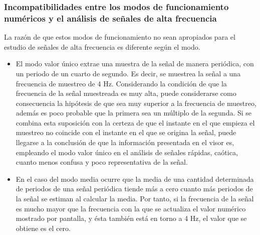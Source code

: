 \subsubsection[Modos numéricos y señales de alta frecuencia]{Incompatibilidades entre los modos de funcionamiento numéricos y el análisis de señales de alta frecuencia}

La razón de que estos modos de funcionamiento no sean apropiados para el estudio de señales de alta frecuencia es diferente según el modo.

\begin{itemize}
	\item El modo valor único extrae una muestra de la señal de manera periódica, con un periodo de un cuarto de segundo. Es decir, se muestrea la señal a una frecuencia de muestreo de 4 Hz. Considerando la condición de que la frecuencia de la señal muestreada es muy alta, puede considerarse como consecuencia la hipótesis de que sea muy superior a la frecuencia de muestreo, además es poco probable que la primera sea un múltiplo de la segunda. Si se combina esta suposición con la certeza de que el instante en el que empieza el muestreo no coincide con el instante en el que se origina la señal, puede llegarse a la conclusión de que la información presentada en el visor es, empleando el modo valor único en el análisis de señales rápidas, caótica, cuanto menos confusa y poco representativa de la señal. %
	\item En el caso del modo media ocurre que la media de una cantidad determinada de periodos de una señal periódica tiende más a cero cuanto más periodos de la señal se estiman al calcular la media. Por tanto, si la frecuencia de la señal es mucho mayor que la frecuencia con la que se actualiza el valor numérico mostrado por pantalla, y ésta también está en torno a 4 Hz, el valor que se obtiene es el cero.
\end{itemize}

